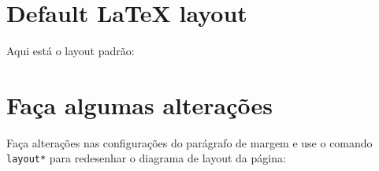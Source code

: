
\usepackage { layout } 

\section { Default \LaTeX {} layout }
Aqui está o layout padrão:

\vspace { 10pt } 
\layout 
\section { Faça algumas alterações } 
Faça alterações nas configurações do parágrafo de margem e use o comando \verb |layout*| para redesenhar o diagrama de layout da página:
 \vspace { 10pt } 
\setlength { \marginparwidth }{ 0pt } 
\setlength { \marginparsep }{ 0pt }

\layout* 
